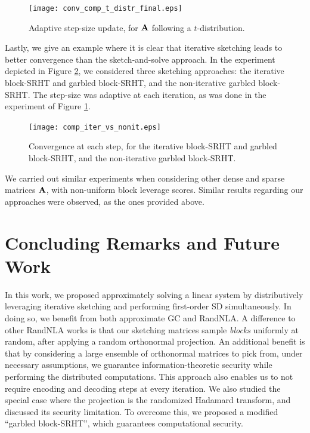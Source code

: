 \documentclass[journal,letterpaper,onecolumn,twoside,nofonttune]{IEEEtran}
\newcommand{\Ab}{\bold{A}}
\begin{document}
\begin{figure}[h]
  \centering
    \texttt{[image: conv\_comp\_t\_distr\_final.eps]}
    \caption{Adaptive step-size update, for $\Ab$ following a $t$-distribution.}
  \label{adaptive_GC_t_distr}
\end{figure}

Lastly, we give an example where it is clear that iterative sketching leads to better convergence than the sketch-and-solve approach. In the experiment depicted in Figure \ref{iter_vs_noniter_fig}, we considered three sketching approaches: the iterative block-SRHT and garbled block-SRHT, and the non-iterative garbled block-SRHT. The step-size was adaptive at each iteration, as was done in the experiment of Figure \ref{adaptive_GC_t_distr}.

\begin{figure}[h]
  \centering
    \texttt{[image: comp\_iter\_vs\_nonit.eps]}
    \caption{Convergence at each step, for the iterative block-SRHT and garbled block-SRHT, and the non-iterative garbled block-SRHT.}
  \label{iter_vs_noniter_fig}
\end{figure}

We carried out similar experiments when considering other dense and sparse matrices $\Ab$, with non-uniform block leverage scores. Similar results regarding our approaches were observed, as the ones provided above.

\section{Concluding Remarks and Future Work}
\label{concl_sec}

In this work, we proposed approximately solving a linear system by distributively leveraging iterative sketching and performing first-order SD simultaneously. In doing so, we benefit from both approximate GC and RandNLA. A difference to other RandNLA works is that our sketching matrices sample \textit{blocks} uniformly at random, after applying a random orthonormal projection. An additional benefit is that by considering a large ensemble of orthonormal matrices to pick from, under necessary assumptions, we guarantee information-theoretic security while performing the distributed computations. This approach also enables us to not require encoding and decoding steps at every iteration. We also studied the special case where the projection is the randomized Hadamard transform, and discussed its security limitation. To overcome this, we proposed a modified ``garbled block-SRHT'', which guarantees computational security.
\end{document}

